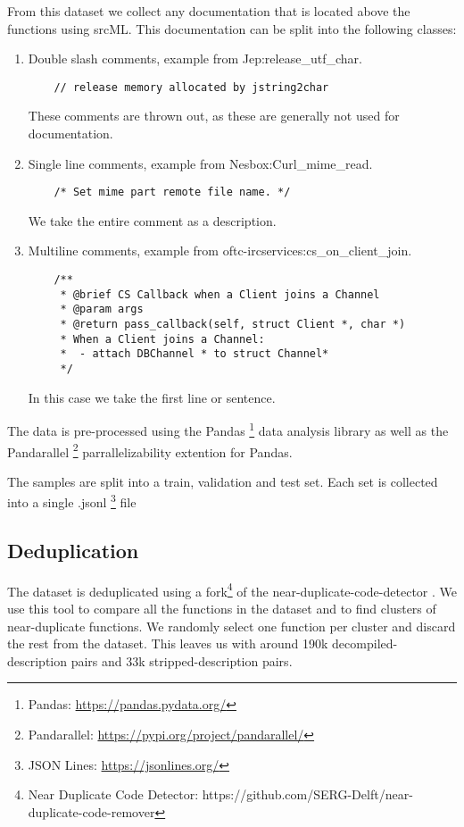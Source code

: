 From this dataset we collect any documentation that is located above the functions using srcML. This documentation can be split into the following classes: %
\begin{enumerate}
  \item Double slash comments, example from Jep:release\_utf\_char. 
\begin{verbatim}
    // release memory allocated by jstring2char
\end{verbatim}
    These comments are thrown out, as these are generally not used for documentation. %
  \item Single line comments, example from Nesbox:Curl\_mime\_read.
\begin{verbatim}
    /* Set mime part remote file name. */
\end{verbatim}
   We take the entire comment as a description.
  \item Multiline comments, example from oftc-ircservices:cs\_on\_client\_join.
\begin{verbatim}
    /**
     * @brief CS Callback when a Client joins a Channel
     * @param args 
     * @return pass_callback(self, struct Client *, char *)
     * When a Client joins a Channel:
     *  - attach DBChannel * to struct Channel*
     */
\end{verbatim}
    In this case we take the first line or sentence.
\end{enumerate}


The data is pre-processed using the Pandas \footnote{Pandas: \url{https://pandas.pydata.org/}} data analysis library as well as the Pandarallel \footnote{Pandarallel: \url{https://pypi.org/project/pandarallel/}} parrallelizability extention for Pandas.

The samples are split into a train, validation and test set. Each set is collected into a single .jsonl \footnote{JSON Lines: \url{https://jsonlines.org/}} file 

\subsection{Deduplication}
The dataset is deduplicated using a fork\footnote{Near Duplicate Code Detector: https://github.com/SERG-Delft/near-duplicate-code-remover} of the near-duplicate-code-detector \cite{allamanis_adverse}. We use this tool to compare all the functions in the dataset and to find clusters of near-duplicate functions. We randomly select one function per cluster and discard the rest from the dataset. This leaves us with around 190k decompiled-description pairs and 33k stripped-description pairs.

